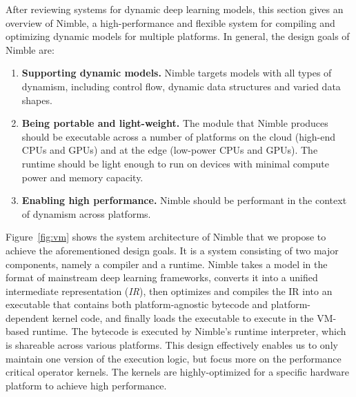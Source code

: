 After reviewing systems for dynamic deep learning models, this section gives an overview of Nimble, a high-performance and flexible system for compiling and optimizing dynamic models for multiple platforms. In general, the design goals of Nimble are:
\begin{enumerate}[leftmargin=*]
    \itemsep 0em
    \item {\bf Supporting dynamic models.} Nimble targets models with all types of dynamism, including control flow, dynamic data structures and varied data shapes.
    \item {\bf Being portable and light-weight.} The module that Nimble produces should be executable across a number of platforms on the cloud (high-end CPUs and GPUs) and at the edge (low-power CPUs and GPUs). The runtime should be light enough to run on devices with minimal compute power and memory capacity.
    \item {\bf Enabling high performance.} Nimble should be performant in the context of dynamism across platforms.
\end{enumerate}

Figure~\ref{fig:vm} shows the system architecture of Nimble that we propose to achieve the aforementioned design goals.
It is a system consisting of two major components, namely a compiler and a runtime.
Nimble takes a model in the format of mainstream deep learning frameworks, converts it into a unified intermediate representation (\textit{IR}), then optimizes and compiles the IR into an executable that contains both platform-agnostic bytecode and platform-dependent kernel code, and finally loads the executable to execute in the VM-based runtime.
The bytecode is executed by Nimble's runtime interpreter, which is shareable across various platforms.
This design effectively enables us to only maintain one version of the execution logic, but focus more on the performance critical operator kernels.
The kernels are highly-optimized for a specific hardware platform to achieve high performance.

